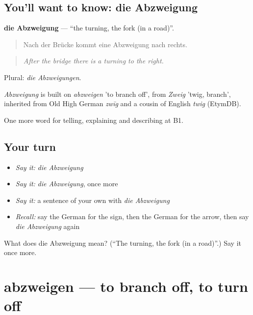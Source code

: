 \subsection*{You'll want to know: die Abzweigung}
\textbf{die Abzweigung} — \textquotedblleft{}the turning, the fork (in a road)\textquotedblright{}.

\begin{quote}
Nach der Brücke kommt eine Abzweigung nach rechts.
\end{quote}

\begin{quote}
\emph{After the bridge there is a turning to the right.}
\end{quote}

Plural: \emph{die Abzweigungen}.

\begin{cousinweb}
\emph{Abzweigung} is built on \emph{abzweigen} 'to branch off', from \emph{Zweig} 'twig, branch', inherited from Old High German \emph{zwīg} and a cousin of English \emph{twig} (EtymDB).
\end{cousinweb}

\begin{grammarlens}[title={What you've built}]
One more word for telling, explaining and describing at B1.
\end{grammarlens}

\subsection*{Your turn}
\begin{itemize}
\raggedright
  \item \emph{Say it:} \emph{die Abzweigung}
  \item \emph{Say it:} \emph{die Abzweigung}, once more
  \item \emph{Say it:} a sentence of your own with \emph{die Abzweigung}
  \item \emph{Recall:} say the German for the sign, then the German for the arrow, then say \emph{die Abzweigung} again
\end{itemize}

\begin{tcolorbox}[breakable,colback=teal!4,colframe=teal!35!black,title={Before you move on}]
What does die Abzweigung mean? (\textquotedblleft{}The turning, the fork (in a road)\textquotedblright{}.) Say it once more.
\end{tcolorbox}
\section[abzweigen]{abzweigen — to branch off, to turn off}

